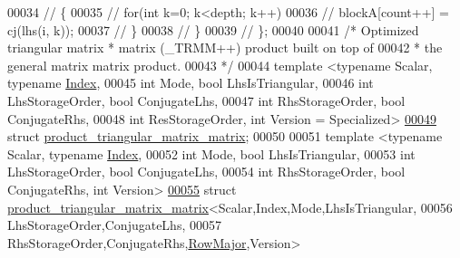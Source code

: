 \begin{DoxyCode}
00034 \textcolor{comment}{//     \{}
00035 \textcolor{comment}{//       for(int k=0; k<depth; k++)}
00036 \textcolor{comment}{//         blockA[count++] = cj(lhs(i, k));}
00037 \textcolor{comment}{//     \}}
00038 \textcolor{comment}{//   \}}
00039 \textcolor{comment}{// \};}
00040 
00041 \textcolor{comment}{/* Optimized triangular matrix * matrix (\_TRMM++) product built on top of}
00042 \textcolor{comment}{ * the general matrix matrix product.}
00043 \textcolor{comment}{ */}
00044 \textcolor{keyword}{template} <\textcolor{keyword}{typename} Scalar, \textcolor{keyword}{typename} \hyperlink{namespace_eigen_a62e77e0933482dafde8fe197d9a2cfde}{Index},
00045           \textcolor{keywordtype}{int} Mode, \textcolor{keywordtype}{bool} LhsIsTriangular,
00046           \textcolor{keywordtype}{int} LhsStorageOrder, \textcolor{keywordtype}{bool} ConjugateLhs,
00047           \textcolor{keywordtype}{int} RhsStorageOrder, \textcolor{keywordtype}{bool} ConjugateRhs,
00048           \textcolor{keywordtype}{int} ResStorageOrder, \textcolor{keywordtype}{int} Version = Specialized>
\hyperlink{struct_eigen_1_1internal_1_1product__triangular__matrix__matrix}{00049} \textcolor{keyword}{struct }\hyperlink{struct_eigen_1_1internal_1_1product__triangular__matrix__matrix}{product\_triangular\_matrix\_matrix};
00050 
00051 \textcolor{keyword}{template} <\textcolor{keyword}{typename} Scalar, \textcolor{keyword}{typename} \hyperlink{namespace_eigen_a62e77e0933482dafde8fe197d9a2cfde}{Index},
00052           \textcolor{keywordtype}{int} Mode, \textcolor{keywordtype}{bool} LhsIsTriangular,
00053           \textcolor{keywordtype}{int} LhsStorageOrder, \textcolor{keywordtype}{bool} ConjugateLhs,
00054           \textcolor{keywordtype}{int} RhsStorageOrder, \textcolor{keywordtype}{bool} ConjugateRhs, \textcolor{keywordtype}{int} Version>
\hyperlink{struct_eigen_1_1internal_1_1product__triangular__matrix__matrix_3_01_scalar_00_01_index_00_01_moa7595ecc6fa7617b9a7dfbf733dbf94b}{00055} \textcolor{keyword}{struct }\hyperlink{struct_eigen_1_1internal_1_1product__triangular__matrix__matrix}{product\_triangular\_matrix\_matrix}<Scalar,Index,Mode,LhsIsTriangular,
00056                                            LhsStorageOrder,ConjugateLhs,
00057                                            RhsStorageOrder,ConjugateRhs,\hyperlink{group__enums_ggaacded1a18ae58b0f554751f6cdf9eb13acfcde9cd8677c5f7caf6bd603666aae3}{RowMajor},Version>

\end{DoxyCode}
